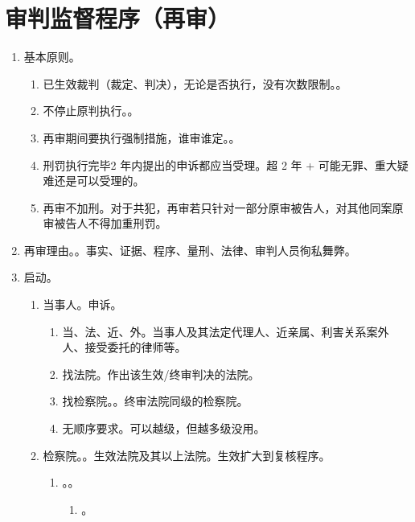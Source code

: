 \section{审判监督程序（再审）}
\begin{enumerate}
  \item 基本原则。
        \begin{enumerate}
          \item 已生效裁判（裁定、判决），无论是否执行，没有次数限制。。
          \item 不停止原判执行。。
          \item 再审期间要执行强制措施，谁审谁定。。
          \item 刑罚执行完毕2 年内提出的申诉都应当受理。超 2 年 + 可能无罪、重大疑难还是可以受理的。
          \item 再审不加刑。对于共犯，再审若只针对一部分原审被告人，对其他同案原审被告人不得加重刑罚。
        \end{enumerate}
  \item 再审理由。。事实、证据、程序、量刑、法律、审判人员徇私舞弊。
  \item 启动。
        \begin{enumerate}
          \item 当事人。申诉。
                \begin{enumerate}
                  \item 当、法、近、外。当事人及其法定代理人、近亲属、利害关系案外人、接受委托的律师等。
                  \item 找法院。作出该生效/终审判决的法院。
                  \item 找检察院。。终审法院同级的检察院。
                  \item 无顺序要求。可以越级，但越多级没用。
                \end{enumerate}
          \item 检察院。。生效法院及其以上法院。生效扩大到复核程序。
                \begin{enumerate}
                  \item {}。。
                        \begin{enumerate}
                          \item {}。

\end{enumerate}
\end{enumerate}
\end{enumerate}
\end{enumerate}
